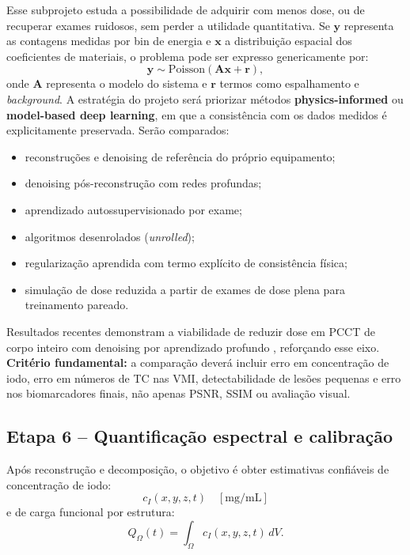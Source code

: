 \documentclass[11pt,a4paper]{article}
\begin{document}
Esse subprojeto estuda a possibilidade de adquirir com menos dose, ou de recuperar exames ruidosos, sem perder a utilidade quantitativa. Se $\mathbf{y}$ representa as contagens medidas por bin de energia e $\mathbf{x}$ a distribuição espacial dos coeficientes de materiais, o problema pode ser expresso genericamente por:
\begin{equation}
\mathbf{y} \sim \text{Poisson}(\mathbf{A}\mathbf{x} + \mathbf{r}),
\end{equation}
onde $\mathbf{A}$ representa o modelo do sistema e $\mathbf{r}$ termos como espalhamento e \emph{background}. A estratégia do projeto será priorizar métodos \textbf{physics-informed} ou \textbf{model-based deep learning}, em que a consistência com os dados medidos é explicitamente preservada. Serão comparados:

\begin{itemize}
\item reconstruções e denoising de referência do próprio equipamento;
\item denoising pós-reconstrução com redes profundas;
\item aprendizado autossupervisionado por exame;
\item algoritmos desenrolados (\emph{unrolled});
\item regularização aprendida com termo explícito de consistência física;
\item simulação de dose reduzida a partir de exames de dose plena para treinamento pareado.
\end{itemize}

Resultados recentes demonstram a viabilidade de reduzir dose em PCCT de corpo inteiro com denoising por aprendizado profundo \cite{denoise}, reforçando esse eixo. \textbf{Critério fundamental:} a comparação deverá incluir erro em concentração de iodo, erro em números de TC nas VMI, detectabilidade de lesões pequenas e erro nos biomarcadores finais, não apenas PSNR, SSIM ou avaliação visual.

\subsection{Etapa 6 -- Quantificação espectral e calibração}

Após reconstrução e decomposição, o objetivo é obter estimativas confiáveis de concentração de iodo:
\begin{equation}
c_{I}(x,y,z,t) \quad [\text{mg/mL}]
\end{equation}
e de carga funcional por estrutura:
\begin{equation}
Q_{\Omega}(t) = \int_{\Omega} c_{I}(x,y,z,t)\, dV.
\end{equation}
\end{document}
